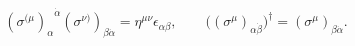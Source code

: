 \begin{equation} \label{eq:sigma_def}
{(\sigma^{(\mu})_\alpha}^{\dot\alpha}
(\sigma^{\nu)})_{\beta \dot\alpha} = \eta^{\mu\nu}\epsilon_{\alpha\beta},
\qquad 
\Big((\sigma^\mu)_{\alpha \dot\beta}\Big)^\dagger = 
     (\sigma^\mu)_{\beta \dot\alpha}.
\end{equation}

